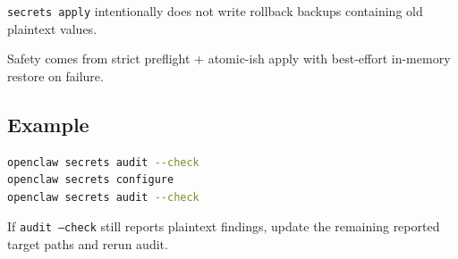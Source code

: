 \texttt{secrets apply} intentionally does not write rollback backups containing old plaintext values.

Safety comes from strict preflight + atomic-ish apply with best-effort in-memory restore on failure.

\subsection{Example}


\begin{lstlisting}[language=bash]
openclaw secrets audit --check
openclaw secrets configure
openclaw secrets audit --check
\end{lstlisting}


If \texttt{audit --check} still reports plaintext findings, update the remaining reported target paths and rerun audit.


\clearpage

